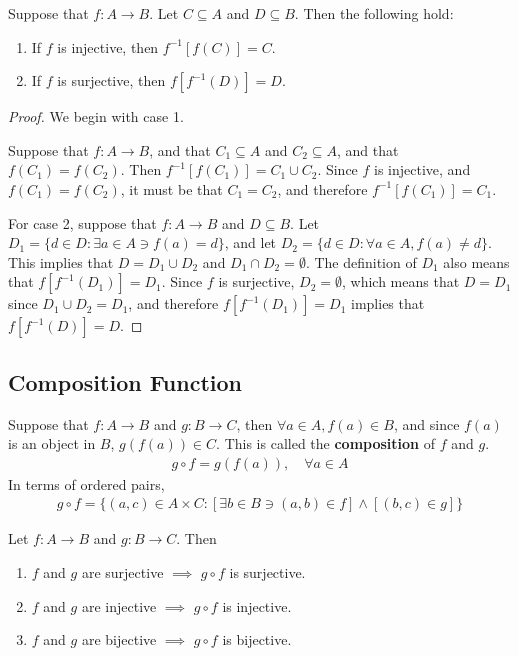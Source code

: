 \begin{theorem}
	\label{theolabel1}
	Suppose that $f:A\rightarrow B$. Let $C\subseteq A$ and $D\subseteq B$. Then the following hold:
	\begin{enumerate}
		\item If $f$ is injective, then $f^{-1}[f(C)]=C$.
		\item If $f$ is surjective, then $f[f^{-1}(D)]=D$.
	\end{enumerate}
\end{theorem}

\begin{proof}
	We begin with case 1.
	
 	Suppose that $f:A\rightarrow B$, and that $C_1\subseteq A$ and $C_2\subseteq A$, and that $f(C_1)=f(C_2)$. Then $f^{-1}[f(C_1)]=C_1\cup C_2$. Since $f$ is injective, and $f(C_1)=f(C_2)$, it must be that $C_1 = C_2$, and therefore $f^{-1}[f(C_1)]=C_1$.\bigskip
 	
 	For case 2, suppose that $f:A\rightarrow B$ and $D\subseteq B$. Let $D_1 = \{d\in D: \exists a\in A \ni f(a)=d\}$, and let $D_2 = \{d\in D: \forall a\in A,f(a)\neq d\}$. This implies that $D = D_1 \cup D_2$ and $D_1 \cap D_2 = \emptyset$. The definition of $D_1$ also means that $f[f^{-1}(D_1)] = D_1$. Since $f$ is surjective, $D_2=\emptyset$, which means that $D = D_1$ since $D_1 \cup D_2 = D_1$, and therefore $f[f^{-1}(D_1)] = D_1$ implies that $f[f^{-1}(D)] = D$.
\end{proof}

\newpage
\subsection{Composition Function}
\begin{definition}
	Suppose that $f:A\rightarrow B$ and $g:B\rightarrow C$, then $\forall a\in A, f(a)\in B$, and since $f(a)$ is an object in $B$, $g(f(a))\in C$. This is called the \textbf{composition} of $f$ and $g$.
	\begin{align*}
		g \circ f = g(f(a)), \quad \forall a\in A
	\end{align*}
	In terms of ordered pairs,
	\begin{align*}
		g \circ f = \{(a,c)\in A\times C:[\exists b\in B\ni (a,b)\in f]\land [(b,c)\in g]\}
	\end{align*}
\end{definition}

\begin{theorem}
	\label{theolabel2}
	Let $f:A\rightarrow B$ and $g:B\rightarrow C$. Then
	\begin{enumerate}
		\item $f$ and $g$ are surjective $\implies$ $g \circ f$ is surjective.
		\item $f$ and $g$ are injective $\implies$ $g \circ f$ is injective.
		\item $f$ and $g$ are bijective $\implies$ $g \circ f$ is bijective.
	\end{enumerate}
\end{theorem}


